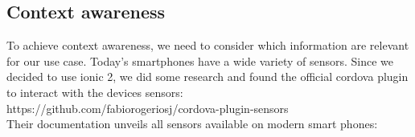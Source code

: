 \documentclass[11pt]{article} %
\begin{document}
\subsection{Context awareness}
To achieve context awareness, we need to consider which information are relevant for our use case. Today's smartphones have a wide variety of sensors. Since we decided to use ionic 2, we did some research and found the official cordova plugin to interact with the devices sensors:\\

https://github.com/fabiorogeriosj/cordova-plugin-sensors\\

Their documentation unveils all sensors available on modern smart phones:\\

\vspace{0.5cm}
\end{document}
